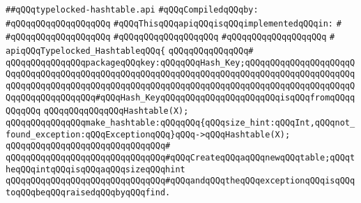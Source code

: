 \label{src/lib/src/typelocked-hashtable.api}
\verb|##qQQqtypelocked-hashtable.api|\newline
\newline
\verb|#qQQqCompiledqQQqby:|\newline
\verb|#qQQqqQQqqQQqqQQqqQQq|\newline
\newline
\newline
\newline
\verb|#qQQqThisqQQqapiqQQqisqQQqimplementedqQQqin:|\newline
\verb|#|\newline
\verb|#qQQqqQQqqQQqqQQqqQQq|\newline
\verb|#qQQqqQQqqQQqqQQqqQQq|\newline
\verb|#qQQqqQQqqQQqqQQqqQQq|\newline
\verb|#|\newline
\verb|apiqQQqTypelocked_HashtableqQQq{|\newline
\verb|qQQqqQQqqQQqqQQq#|\newline
\verb|qQQqqQQqqQQqqQQqpackageqQQqkey:qQQqqQQqHash_Key;qQQqqQQqqQQqqQQqqQQqqQQqqQQqqQQqqQQqqQQqqQQqqQQqqQQqqQQqqQQqqQQqqQQqqQQqqQQqqQQqqQQqqQQqqQQqqQQqqQQqqQQqqQQqqQQqqQQqqQQqqQQqqQQqqQQqqQQqqQQqqQQqqQQqqQQqqQQqqQQqqQQqqQQqqQQqqQQqqQQq#qQQqHash_KeyqQQqqQQqqQQqqQQqqQQqqQQqisqQQqfromqQQqqQQqqQQq|\newline
\newline
\verb|qQQqqQQqqQQqqQQqHashtable(X);|\newline
\newline
\verb|qQQqqQQqqQQqqQQqmake_hashtable:qQQqqQQq{qQQqsize_hint:qQQqInt,qQQqnot_found_exception:qQQqExceptionqQQq}qQQq->qQQqHashtable(X);|\newline
\verb|qQQqqQQqqQQqqQQqqQQqqQQqqQQqqQQq#|\newline
\verb|qQQqqQQqqQQqqQQqqQQqqQQqqQQqqQQq#qQQqCreateqQQqaqQQqnewqQQqtable;qQQqtheqQQqintqQQqisqQQqaqQQqsizeqQQqhint|\newline
\verb|qQQqqQQqqQQqqQQqqQQqqQQqqQQqqQQq#qQQqandqQQqtheqQQqexceptionqQQqisqQQqtoqQQqbeqQQqraisedqQQqbyqQQqfind.|\newline
\newline
